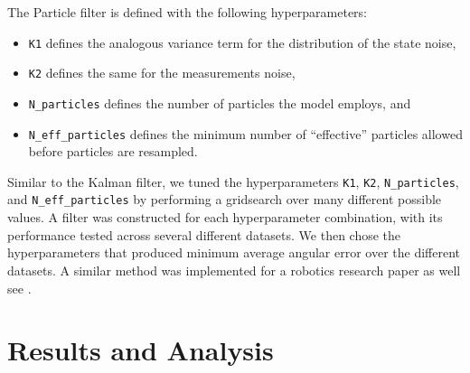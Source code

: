 \documentclass[11pt]{amsart}
\begin{document}
The Particle filter is defined with the following hyperparameters: 
\begin{itemize}
    \item \lstinline{K1} defines the analogous variance term for the distribution of the state noise,
    \item \lstinline{K2} defines the same for the measurements noise,
    \item \lstinline{N_particles} defines the number of particles the model employs, and
    \item \lstinline{N_eff_particles} defines the minimum number of “effective” particles allowed before particles are resampled.
\end{itemize}

Similar to the Kalman filter, we tuned the hyperparameters \lstinline{K1}, \lstinline{K2}, \lstinline{N_particles}, and \lstinline{N_eff_particles} by performing a gridsearch over many different possible values. A filter was constructed for each hyperparameter combination, with its performance 
tested across several different datasets. We then chose the hyperparameters that produced minimum average angular error over the different datasets. A similar method was implemented for a robotics research paper as well see \cite{Oops}.

\section{Results and Analysis}
\end{document}
